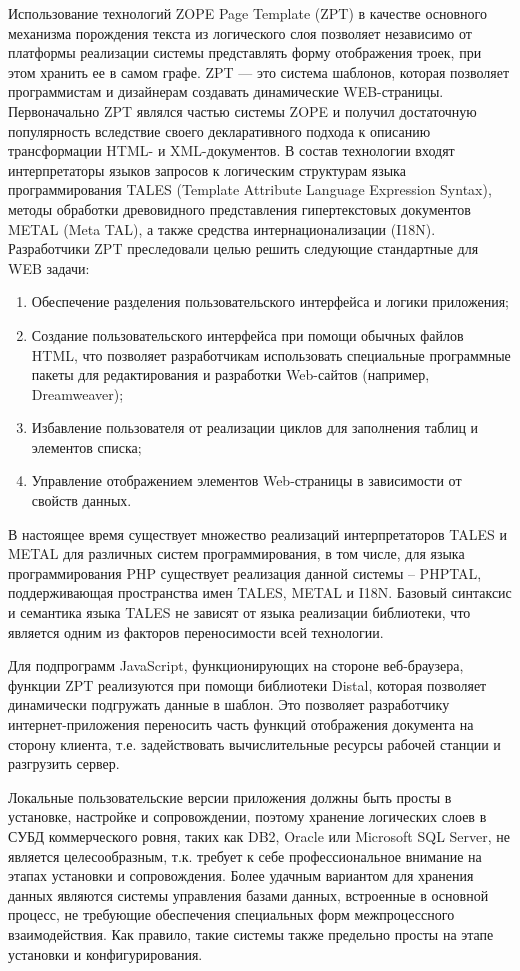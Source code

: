 \documentclass[utf8]{../IncArticle}
\begin{document}
Использование технологий ZOPE Page Template (ZPT) в качестве основного
механизма порождения текста из логического слоя позволяет независимо
от платформы реализации системы представлять форму отображения троек,
при этом хранить ее в самом графе.  ZPT --- это система шаблонов,
которая позволяет программистам и дизайнерам создавать динамические
WEB-страницы.  Первоначально ZPT являлся частью системы ZOPE и получил
достаточную популярность вследствие своего декларативного подхода к
описанию трансформации HTML- и XML-документов.  В состав технологии
входят интерпретаторы языков запросов к логическим структурам языка
программирования TALES (Template Attribute Language Expression
Syntax), методы обработки древовидного представления гипертекстовых
документов METAL (Meta TAL), а также средства интернационализации
(I18N).  Разработчики ZPT преследовали целью решить следующие
стандартные для WEB задачи:
\begin{enumerate}
\item Обеспечение разделения пользовательского интерфейса и логики
  приложения;
\item Создание пользовательского интерфейса при помощи обычных файлов
  HTML, что позволяет разработчикам использовать специальные
  программные пакеты для редактирования и разработки Web-сайтов
  (например, Dreamweaver);
\item Избавление пользователя от реализации циклов для заполнения
  таблиц и элементов списка;
\item Управление отображением элементов Web-страницы в зависимости от
  свойств данных.
\end{enumerate}

В настоящее время существует множество реализаций интерпретаторов
TALES и METAL для различных систем программирования, в том числе, для
языка программирования PHP существует реализация данной системы –
PHPTAL, поддерживающая пространства имен TALES, METAL и I18N.  Базовый
синтаксис и семантика языка TALES не зависят от языка
реализации библиотеки, что является одним из факторов переносимости
всей технологии.

Для подпрограмм JavaScript, функционирующих на стороне веб-браузера,
функции ZPT реализуются при помощи библиотеки Distal, которая
позволяет динамически подгружать данные в шаблон.  Это позволяет
разработчику интернет-приложения переносить часть функций отображения
документа на сторону клиента, т.е. задействовать вычислительные
ресурсы рабочей станции и разгрузить сервер.

Локальные пользовательские версии приложения должны быть просты в
установке, настройке и сопровождении, поэтому хранение логических
слоев в СУБД коммерческого ровня, таких как DB2, Oracle или Microsoft
SQL Server, не является целесообразным, т.к. требует к себе
профессиональное внимание на этапах установки и сопровождения.  Более
удачным вариантом для хранения данных являются системы управления
базами данных, встроенные в основной процесс, не требующие обеспечения
специальных форм межпроцессного взаимодействия.  Как правило, такие
системы также предельно просты на этапе установки и конфигурирования.
\end{document}
